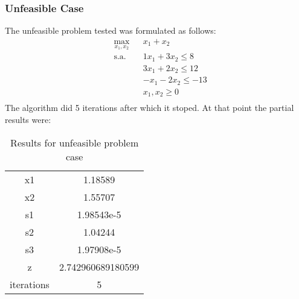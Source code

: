\documentclass[a4paper]{IEEEtran}
\begin{document}
\subsubsection{Unfeasible Case}
The unfeasible problem tested was formulated as follows:
       \begin{equation}
        \begin{aligned}
            & \underset{x_1, x_2}{\text{max}}
            & & x_1 + x_2\\
            & \text{s.a.}
            & & 1x_1  + 3x_2 \leq 8 \\
            &&& 3x_1 + 2x_2 \leq 12 \\
            &&& -x_1 - 2x_2 \leq -13 \\
            &&& x_1, x_2 \geq 0 \\
        \end{aligned}
    \end{equation}
     The algorithm did 5 iterations after which it stoped. At that point the partial results were:\\
        \begin{table}[H]
            \centering
            \begin{tabular}{c|c}
                 {x1} & 1.18589\\
                {x2} &  1.55707\\
                {s1} & 1.98543e-5\\
                {s2} & 1.04244\\
                {s3} & 1.97908e-5\\
                {z} & 2.742960689180599\\
            iterations  & 5 \\
            \end{tabular}
            \caption{Results for unfeasible problem case}
            \label{tab:4}
        \end{table}
\end{document}
